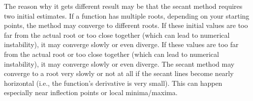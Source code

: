 \documentclass[a4paper]{article}
\begin{document}
The reason why it gets different result may be that
the secant method requires two initial estimates. If a function has multiple roots, depending on your starting points, 
the method may converge to different roots. If these initial values are too far from the actual root or too close together (which can lead 
to numerical instability), it may converge slowly or even diverge.
If these values are too far from the actual root or too close together (which
 can lead to numerical instability), it may converge slowly or even diverge. 
 The secant method may converge to a root very slowly or not at all if the secant lines become nearly horizontal (i.e., the function's derivative is very small). This can happen especially near inflection points or local minima/maxima.
\end{document}
